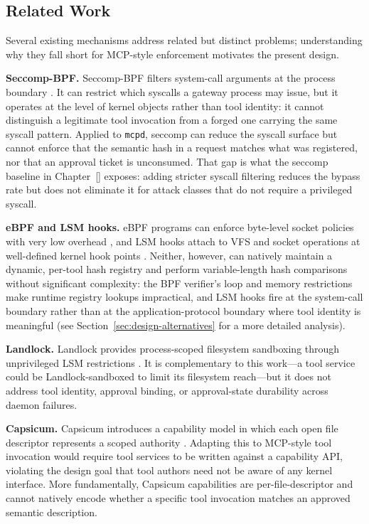 \subsection{Related Work}
\label{sec:related-work}

Several existing mechanisms address related but distinct problems; understanding why they fall short for MCP-style enforcement motivates the present design.

\textbf{Seccomp-BPF.}
Seccomp-BPF filters system-call arguments at the process boundary \cite{seccomp2026}.
It can restrict which syscalls a gateway process may issue, but it operates at the level of kernel objects rather than tool identity: it cannot distinguish a legitimate tool invocation from a forged one carrying the same syscall pattern.
Applied to \texttt{mcpd}, seccomp can reduce the syscall surface but cannot enforce that the semantic hash in a request matches what was registered, nor that an approval ticket is unconsumed.
That gap is what the seccomp baseline in Chapter~\ref{} exposes: adding stricter syscall filtering reduces the bypass rate but does not eliminate it for attack classes that do not require a privileged syscall.

\textbf{eBPF and LSM hooks.}
eBPF programs can enforce byte-level socket policies with very low overhead \cite{lsm2026}, and LSM hooks attach to VFS and socket operations at well-defined kernel hook points \cite{krohn2007flume}.
Neither, however, can natively maintain a dynamic, per-tool hash registry and perform variable-length hash comparisons without significant complexity: the BPF verifier's loop and memory restrictions make runtime registry lookups impractical, and LSM hooks fire at the system-call boundary rather than at the application-protocol boundary where tool identity is meaningful (see Section~\ref{sec:design-alternatives} for a more detailed analysis).

\textbf{Landlock.}
Landlock provides process-scoped filesystem sandboxing through unprivileged LSM restrictions \cite{landlock2026}.
It is complementary to this work---a tool service could be Landlock-sandboxed to limit its filesystem reach---but it does not address tool identity, approval binding, or approval-state durability across daemon failures.

\textbf{Capsicum.}
Capsicum introduces a capability model in which each open file descriptor represents a scoped authority \cite{watson2010capsicum}.
Adapting this to MCP-style tool invocation would require tool services to be written against a capability API, violating the design goal that tool authors need not be aware of any kernel interface.
More fundamentally, Capsicum capabilities are per-file-descriptor and cannot natively encode whether a specific tool invocation matches an approved semantic description.


